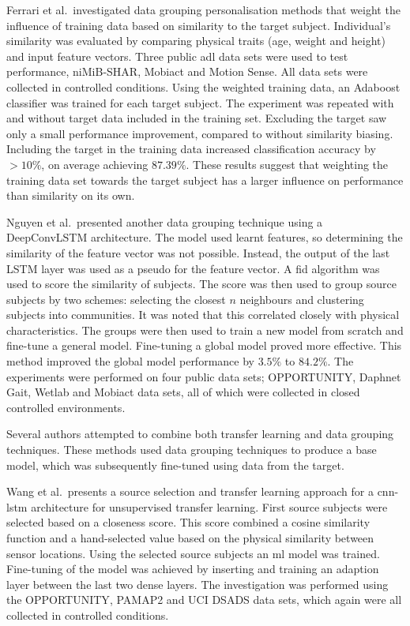 Ferrari et al.~investigated data grouping personalisation methods that weight the influence of training data based on similarity to the target subject. Individual's similarity was evaluated by comparing physical traits (age, weight and height) and input feature vectors. Three public \acrfull{adl} data sets were used to test performance, niMiB-SHAR\cite{Micucci2017}, Mobiact\cite{Vavoulas2016} and Motion Sense\cite{Katevas2014}. All data sets were collected in controlled conditions. Using the weighted training data, an Adaboost classifier was trained for each target subject. The experiment was repeated with and without target data included in the training set. Excluding the target saw only a small performance improvement, compared to without similarity biasing. Including the target in the training data increased classification accuracy by $>10\%$, on average achieving $87.39\%$. These results suggest that weighting the training data set towards the target subject has a larger influence on performance than similarity on its own.\cite{Ferrari2020}

Nguyen et al.~presented another data grouping technique using a DeepConvLSTM architecture. The model used learnt features, so determining the similarity of the feature vector was not possible. Instead, the output of the last LSTM layer was used as a pseudo for the feature vector. A \acrfull{fid} algorithm was used to score the similarity of subjects. The score was then used to group source subjects by two schemes: selecting the closest $n$ neighbours and clustering subjects into communities. It was noted that this correlated closely with physical characteristics. The groups were then used to train a new model from scratch and fine-tune a general model. Fine-tuning a global model proved more effective. This method improved the global model performance by $3.5\%$ to $84.2\%$. The experiments were performed on four public data sets; OPPORTUNITY\cite{Roggen2009}, Daphnet Gait\cite{Sigcha2020}, Wetlab\cite{Scholl2015} and Mobiact\cite{Vavoulas2016} data sets, all of which were collected in closed controlled environments.\cite{Nguyen2021}

Several authors attempted to combine both transfer learning and data grouping techniques. These methods used data grouping techniques to produce a base model, which was subsequently fine-tuned using data from the target.

Wang et al.~presents a source selection and transfer learning approach for a \acrshort{cnn}-\acrshort{lstm} architecture for unsupervised transfer learning. First source subjects were selected based on a closeness score. This score combined a cosine similarity function and a hand-selected value based on the physical similarity between sensor locations. Using the selected source subjects an \acrshort{ml} model was trained. Fine-tuning of the model was achieved by inserting and training an adaption layer between the last two dense layers. The investigation was performed using the OPPORTUNITY\cite{Roggen2009}, PAMAP2\cite{Reiss2012} and UCI DSADS\cite{Altun2010} data sets, which again were all collected in controlled conditions.\cite{Wang2018a}

